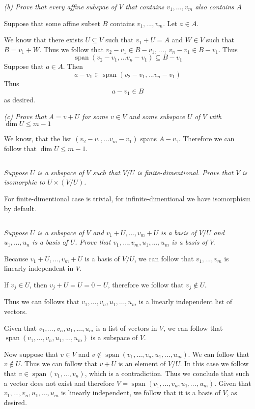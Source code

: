 \documentclass[11pt,oneside,titlepage]{book}
\DeclareMathOperator \Span {span}
\begin{document}
\textit{(b) Prove that every affine subspae of $V$ that contains $v_1, ..., v_m$ also
  contains $A$}

Suppose that some affine subset $B$ contains $v_1, ..., v_m$.
Let $a \in A$. 

We know that there exists $U \subseteq V$ such that $v_1 + U = A$ and $W \in V$ such
that $B = v_1 + W$.
Thus we follow that $v_2 - v_1 \in B - v_1$, ..., $v_n - v_1 \in B - v_1$. Thus
$$\Span(v_2 - v_1, ... v_n - v_1) \subseteq B - v_1$$
Suppose that $a \in A$. Then
$$a - v_1 \in \Span(v_2 - v_1, ... v_n - v_1)$$
Thus
$$a - v_1 \in B$$
as desired.

\textit{(c) Prove that $A = v + U$ for some $v \in V$ and some subspace $U$ of $V$
  with $\dim U \leq m - 1$}

We know, that the list $(v_2 - v_1, ... v_m - v_1)$ spans $A - v_1$. Therefore we can follow
that $\dim U \leq m - 1$.

\subsection{}

\textit{Suppose $U$ is a subspace of $V$ such that $V/U$ is finite-dimentional. Prove that
  $V$ is isomorphic to $U \times (V / U)$.}

For finite-dimentional case is trivial, for infinite-dimentional we have isomorphism by default.

\subsection{}

\textit{Suppose $U$ is a subspace of $V$ and $v_1 + U, ..., v_m + U$ is a basis of $V/U$
  and $u_1, ..., u_n$ is a basis of $U$. Prove that $v_1, ..., v_m, u_1, ..., u_m$ is a basis
  of $V$.}

Because $v_1 + U, ..., v_m + U$ is a basis of $V/U$, we can follow that $v_1, ..., v_m$ is
linearly independent in $V$.

If $v_j \in U$, then $v_j + U = U = 0 + U$, therefore we follow that $v_j \notin U$.

Thus we can follows that $v_1, ..., v_n, u_1, ..., u_m$ is a linearly independent list of
vectors.

Given that $v_1, ..., v_n, u_1, ..., u_m$ is a list of vectors in $V$, we can follow that
$\Span(v_1, ..., v_n, u_1, ..., u_m)$ is a subspace of $V$.

Now suppose that $v \in V$ and $v \notin \Span(v_1, ..., v_n, u_1, ..., u_m)$. We can follow that
$v \notin U$. Thus we can follow that $v + U$ is an element of $V/U$. In this case we
follow that $v \in \Span(v_1, ..., v_n)$, which is a contradiction. Thus we conclude that
such a vector does not exist and therefore $V = \Span(v_1, ..., v_n, u_1, ..., u_m)$.
Given that $v_1, ..., v_n, u_1, ..., u_m$ is linearly independent, we follow that
it is a basis of $V$, as desired.
\end{document}
